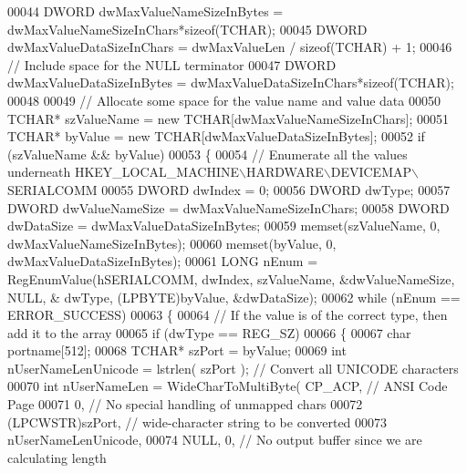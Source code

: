 \begin{DoxyCode}
00044             DWORD dwMaxValueNameSizeInBytes = dwMaxValueNameSizeInChars*\textcolor{keyword}{sizeof}(TCHAR);
00045             DWORD dwMaxValueDataSizeInChars = dwMaxValueLen / \textcolor{keyword}{sizeof}(TCHAR) + 1;
00046             \textcolor{comment}{// Include space for the NULL terminator}
00047             DWORD dwMaxValueDataSizeInBytes = dwMaxValueDataSizeInChars*\textcolor{keyword}{sizeof}(TCHAR);
00048 
00049             \textcolor{comment}{// Allocate some space for the value name and value data}
00050             TCHAR* szValueName = \textcolor{keyword}{new} TCHAR[dwMaxValueNameSizeInChars];
00051             TCHAR* byValue = \textcolor{keyword}{new} TCHAR[dwMaxValueDataSizeInBytes];
00052             \textcolor{keywordflow}{if} (szValueName && byValue)
00053             \{
00054                 \textcolor{comment}{// Enumerate all the values underneath HKEY\_LOCAL\_MACHINE\(\backslash\)HARDWARE\(\backslash\)DEVICEMAP\(\backslash\)SERIALCOMM}
00055                 DWORD dwIndex = 0;
00056                 DWORD dwType;
00057                 DWORD dwValueNameSize = dwMaxValueNameSizeInChars;
00058                 DWORD dwDataSize = dwMaxValueDataSizeInBytes;
00059                 memset(szValueName, 0, dwMaxValueNameSizeInBytes);
00060                 memset(byValue, 0, dwMaxValueDataSizeInBytes);
00061                 LONG nEnum = RegEnumValue(hSERIALCOMM, dwIndex, szValueName, &dwValueNameSize, NULL, &
      dwType, (LPBYTE)byValue, &dwDataSize);
00062                 \textcolor{keywordflow}{while} (nEnum == ERROR\_SUCCESS)
00063                 \{
00064                     \textcolor{comment}{// If the value is of the correct type, then add it to the array}
00065                     \textcolor{keywordflow}{if} (dwType == REG\_SZ)
00066                     \{
00067                         \textcolor{keywordtype}{char} portname[512];
00068                         TCHAR* szPort = byValue;
00069                         \textcolor{keywordtype}{int} nUserNameLenUnicode = lstrlen( szPort ); \textcolor{comment}{// Convert all UNICODE characters}
00070                         \textcolor{keywordtype}{int} nUserNameLen = WideCharToMultiByte( CP\_ACP, \textcolor{comment}{// ANSI Code Page}
00071                         0, \textcolor{comment}{// No special handling of unmapped chars}
00072                         (LPCWSTR)szPort, \textcolor{comment}{// wide-character string to be converted}
00073                         nUserNameLenUnicode,
00074                         NULL, 0, \textcolor{comment}{// No output buffer since we are calculating length}

\end{DoxyCode}
